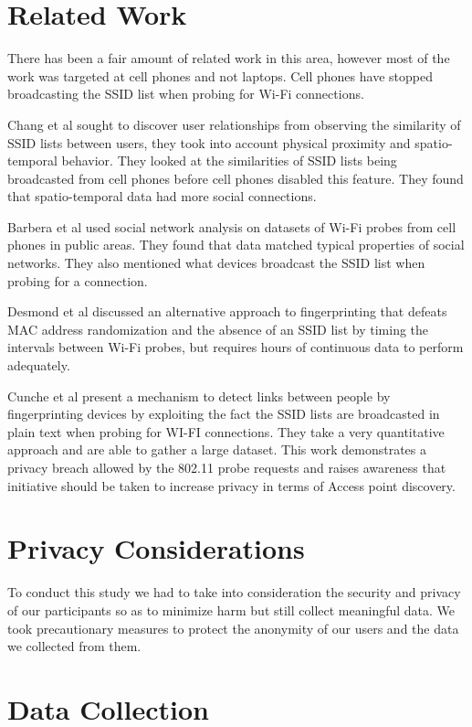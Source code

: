 \documentclass[letterpaper,twocolumn,10pt]{article}
\begin{document}
\section{Related Work}
There has been a fair amount of related work in this area, however most of the work was targeted at cell phones and not laptops. Cell phones have stopped broadcasting the SSID list when probing for Wi-Fi connections.

Chang et al  sought to discover user relationships from observing the similarity of SSID lists between users, they took into account physical proximity and spatio-temporal behavior. They looked at the similarities of SSID lists being broadcasted from cell phones before cell phones disabled this feature. They found that spatio-temporal data had more social connections. 

Barbera et al  used social network analysis on datasets of Wi-Fi probes from cell phones in public areas. They found that data matched typical properties of social networks. They also mentioned what devices broadcast the SSID list when probing for a connection.

Desmond et al discussed an alternative approach to fingerprinting that defeats MAC address 
randomization and the absence of an SSID list by timing the intervals between Wi-Fi probes, but requires hours of continuous data to perform adequately.

Cunche et al  present a mechanism to detect links between people by fingerprinting devices by exploiting the fact the SSID lists are broadcasted in plain text when probing for WI-FI connections. They take a very quantitative approach and are able to gather a large dataset. This work demonstrates a privacy breach allowed by the 802.11 probe requests and raises awareness that initiative should be taken to increase privacy in terms of Access point discovery. 


\section{Privacy Considerations}
To conduct this study we had to take into consideration the security and privacy of our participants so as to minimize harm but still collect meaningful data. We took precautionary measures to protect the anonymity of our users and the data we collected from them.



\section{Data Collection}
\end{document}
